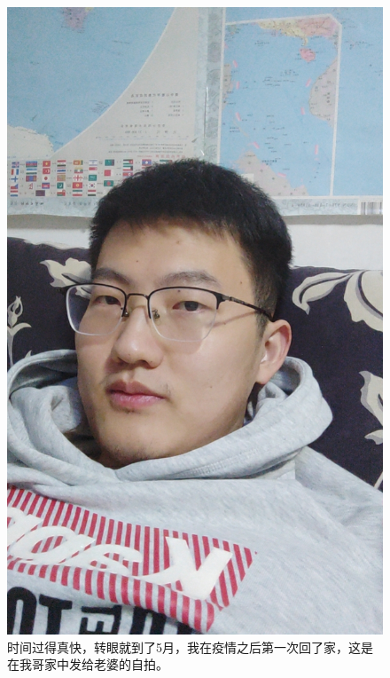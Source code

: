 \documentclass[cn,11pt,chinese]{elegantbook}
\begin{document}
\begin{figure}
    \includegraphics[height=0.2\textheight]{figure/figure/panmeng.jpg}
    \caption{时间过得真快，转眼就到了5月，我在疫情之后第一次回了家，这是在我哥家中发给老婆的自拍。}
\end{figure}
\end{document}
